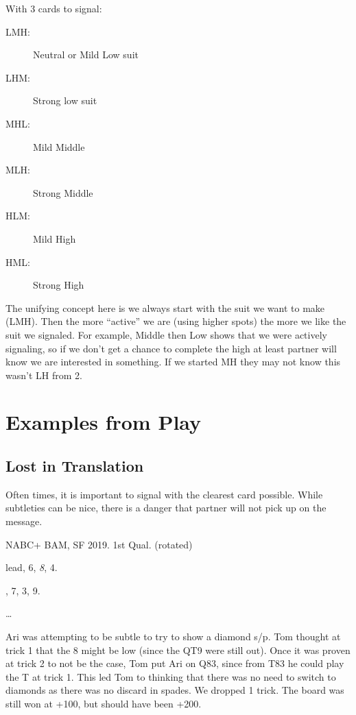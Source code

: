 \documentclass[tom-ari]{subfiles}
\begin{document}
With 3 cards to signal:

\begin{description}
	\item [LMH:] Neutral or Mild Low suit
	\item [LHM:] Strong low suit
	\item [MHL:] Mild Middle
	\item [MLH:] Strong Middle
	\item [HLM:] Mild High
	\item [HML:] Strong High
\end{description}

The unifying concept here is we always start with the suit we want to make (LMH). Then the more ``active'' we are (using higher spots) the more we like the suit we signaled.  For example, Middle then Low shows that we were actively signaling, so if we don't get a chance to complete the high at least partner will know we are interested in something. If we started MH they may not know this wasn't LH from 2.

\chapter{Examples from Play}

\section{Lost in Translation}

Often times, it is important to signal with the clearest card possible. While subtleties can be nice, there is a danger that partner will not pick up on the message. 

NABC+ BAM, SF 2019. 1st Qual. (rotated)

\begin{handdiagram}
\end{handdiagram}	 	


 lead, 6, \textit{8}, 4.

, 7, 3, 9.

 \ldots

Ari was attempting to be subtle to try to show a diamond s/p. Tom thought at trick 1 that the 8 might be low (since the QT9 were still out). Once it was proven at trick 2 to not be the case, Tom put Ari on Q83, since from T83 he could play the T at trick 1. This led Tom to thinking that there was no need to switch to diamonds as there was no discard in spades. We dropped 1 trick. The board was still won at +100, but should have been +200.
\end{document}
